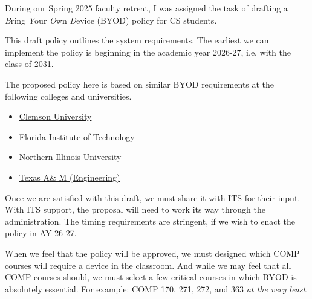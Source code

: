 \noindent 
During our Spring 2025 faculty retreat, I was assigned the task of drafting a \emph{B}ring \emph{Y}our \emph{O}wn \emph{D}evice (BYOD) policy for CS students. 

This draft policy outlines the system requirements. The earliest we can implement the policy is beginning in the academic year 2026-27, i.e, with the class of 2031.

The proposed policy here is based on similar BYOD requirements at the following colleges and universities.

\begin{itemize}
    \item \href{https://clemsonpub.cfmnetwork.com/B.aspx?BookId=11654&PageId=458060}{Clemson University}
    
    \item \href{https://www.fit.edu/policies/information-technology/policies/it-1015-bring-your-own-device-byod-policy/}{Florida Institute of Technology}
    
    \item Northern Illinois University

    \item \href{https://engineering.tamu.edu/academics/byod/index.html}{Texas A\& M (Engineering)}
\end{itemize}

Once we are satisfied with this draft, we must share it with ITS for their input. With ITS support, the proposal will need to work its way through the administration. The timing requirements are stringent, if we wish to enact the policy in AY 26-27.

When we feel that the policy will be approved, we must designed which COMP courses will require a device in the classroom. And while we may feel that all COMP courses should, we must select a few critical courses in which BYOD is absolutely essential. For example: COMP 170, 271, 272, and 363 \emph{at the very least}.

\newpage